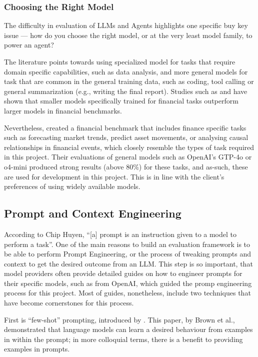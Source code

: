 \documentclass[a4paper]{report}
\begin{document}
\subsubsection{Choosing the Right Model}

The difficulty in evaluation of LLMs and Agents highlights one specific buy key issue --- how do you choose the right model, or at the very least model family, to power an agent?

The literature points towards using specialized model for tasks that require domain specific capabilities, such as data analysis, and more general models for task that are common in the general training data, such as coding, tool calling or general summarization (e.g., writing the final report). Studies such as \cite{ke2025demystifyingdomainadaptiveposttrainingfinancial} and \cite{tanabe2024enhancingfinancialdomainadaptation} have shown that smaller models specifically trained for financial tasks outperform larger models in financial benchmarks.

Nevertheless, \cite{lu2025bizfinbench} created a financial benchmark that includes finance specific tasks such as forecasting market trends, predict asset movements, or analysing causal relationships in financial events, which closely resemble the types of task required in this project. Their evaluations of general models such as OpenAI's GTP-4o or o4-mini produced strong results (above 80\%) for these tasks, and as-such, these are used for development in this project. This is in line with the client's preferences of using widely available models.

\subsection{Prompt and Context Engineering}

According to Chip Huyen, ``[a] prompt is an instruction given to a model to perform a task''. One of the main reasons to build an evaluation framework is to be able to perform Prompt Engineering, or the process of tweaking prompts and context to get the desired outcome from an LLM. This step is so important, that model providers often provide detailed guides on how to engineer prompts for their specific models, such as \cite{openai2025promptengineering} from OpenAI, which guided the promp engineering process for this project. Most of guides, nonetheless, include two techniques that have become cornerstones for this process.

First is ``few-shot'' prompting, introduced by \cite{brown2020languagemodelsfewshotlearners}. This paper, by Brown et al., demonstrated that language models can learn a desired behaviour from examples in within the prompt; in more colloquial terms, there is a benefit to providing examples in prompts.
\end{document}
